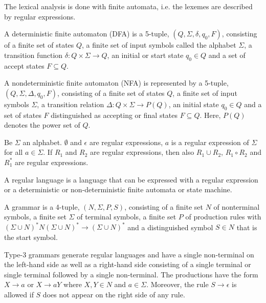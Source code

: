 The lexical analysis is done with finite automata, i.e. the lexemes are described by regular expressions.

\begin{defi}
	A deterministic finite automaton (DFA) is a 5-tuple, $(Q, \Sigma, \delta, q_0, F)$, consisting of a finite set of states $Q$, a finite set of input symbols called the alphabet $\Sigma$, a transition function $\delta : Q \times \Sigma \rightarrow Q$, an initial or start state $q_0 \in Q$ and a set of accept states $F \subseteq Q$.
\end{defi}

\begin{defi}
	A nondeterministic finite automaton (NFA) is represented by a 5-tuple, $(Q, \Sigma, \Delta, q_0, F)$, consisting of a finite set of states $Q$, a finite set of input symbols $\Sigma$, a transition relation $\Delta : Q \times \Sigma \rightarrow P(Q)$, an initial state $q_0 \in Q$ and a set of states $F$ distinguished as accepting or final states $F \subseteq Q$. Here, $P(Q)$ denotes the power set of $Q$.
\end{defi}

\begin{defi}
	Be $\Sigma$ an alphabet. $\emptyset$ and $\epsilon$ are regular expressions, $a$ is a regular expression of $\Sigma$ for all $a \in \Sigma$. If $R_1$ and $R_2$ are regular expressions, then also $R_1 \cup R_2$, $R_1 \circ R_2$ and $R_1^*$ are regular expressions.
\end{defi}

\begin{defi}
	A regular language is a language that can be expressed with a regular expression or a deterministic or non-deterministic finite automata or state machine.
\end{defi}

\begin{defi}[Grammar]
	A grammar is a 4-tuple, $(N, \Sigma, P, S)$, consisting of a finite set $N$ of nonterminal symbols, a finite set $\Sigma$ of terminal symbols, a finite set $P$ of production rules with $(\Sigma \cup N)^* N(\Sigma \cup N)^* \rightarrow (\Sigma \cup N)^*$ and a distinguished symbol $S \in N$ that is the start symbol.
\end{defi}

Type-3 grammars generate regular languages and have a single non-terminal on the left-hand side as well as a right-hand side consisting of a single terminal or single terminal followed by a single non-terminal. The productions have the form $X \rightarrow a$ or $X \rightarrow aY$ where $X, Y \in N$ and $a \in \Sigma$. Moreover, the rule $S \rightarrow \epsilon$ is allowed if $S$ does not appear on the right side of any rule.

